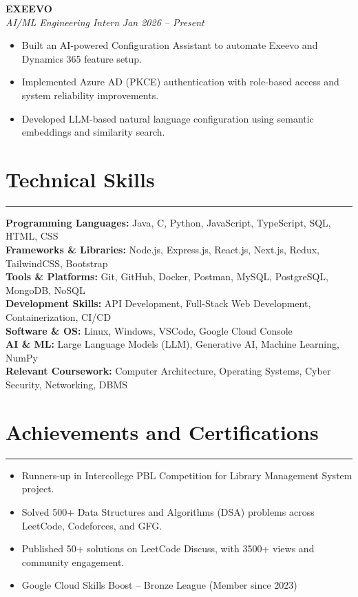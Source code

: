 \documentclass[a4paper,10pt]{article}
\begin{document}
\vspace{2pt}

\textbf{EXEEVO} \\
\textit{AI/ML Engineering Intern} \hfill \textit{Jan 2026 -- Present}
\begin{itemize}
\item Built an AI-powered Configuration Assistant to automate Exeevo and Dynamics 365 feature setup.
  \item Implemented Azure AD (PKCE) authentication with role-based access and system reliability improvements.
  \item Developed LLM-based natural language configuration using semantic embeddings and similarity search.
\end{itemize}

\vspace{6pt}
\section*{Technical Skills}
\rule{\linewidth}{0.4pt}
\begin{flushleft}
\textbf{Programming Languages:} Java, C, Python, JavaScript, TypeScript, SQL, HTML, CSS \\
\textbf{Frameworks \& Libraries:} Node.js, Express.js, React.js, Next.js, Redux, TailwindCSS, Bootstrap \\
\textbf{Tools \& Platforms:} Git, GitHub, Docker, Postman, MySQL, PostgreSQL, MongoDB, NoSQL \\
\textbf{Development Skills:} API Development, Full-Stack Web Development, Containerization, CI/CD \\
\textbf{Software \& OS:} Linux, Windows, VSCode, Google Cloud Console \\
\textbf{AI \& ML:} Large Language Models (LLM), Generative AI, Machine Learning, NumPy \\
\textbf{Relevant Coursework:} Computer Architecture, Operating Systems, Cyber Security, Networking, DBMS
\end{flushleft}

\vspace{6pt}
\section*{Achievements and Certifications}
\rule{\linewidth}{0.4pt}

\begin{itemize}[leftmargin=1.2em, itemsep=2pt, topsep=0pt, parsep=0pt]
  \item Runners-up in Intercollege PBL Competition for Library Management System project.
  \item Solved 500+ Data Structures and Algorithms (DSA) problems across LeetCode, Codeforces, and GFG.
  \item Published 50+ solutions on LeetCode Discuss, with 3500+ views and community engagement.
  \item Google Cloud Skills Boost – Bronze League (Member since 2023)~\href{https://www.cloudskillsboost.google/public_profiles/fa563759-0891-4a0a-ba22-a0ea94817ef7}{\faExternalLink}
\end{itemize}
\end{document}
